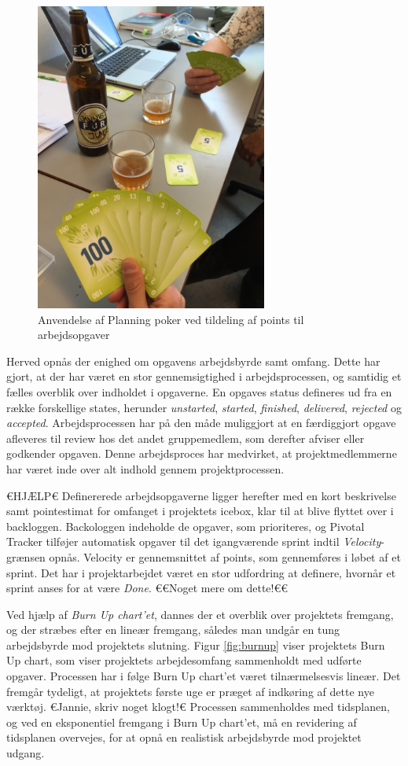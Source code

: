 	\begin{figure}[htb]
	\centering
	\includegraphics[width=3in]{Planningpoker}
	\caption{Anvendelse af Planning poker ved tildeling af points til arbejdsopgaver}
	\label{fig:planningpoker}	
	\end{figure}
	
	Herved opnås der enighed om opgavens arbejdsbyrde samt omfang. Dette har gjort, at der har været en stor gennemsigtighed i arbejdsprocessen, og samtidig et fælles overblik over indholdet i opgaverne. En opgaves status defineres ud fra en række forskellige states, herunder \textit{unstarted}, \textit{started}, \textit{finished}, \textit{delivered}, \textit{rejected} og \textit{accepted}. Arbejdsprocessen har på den måde muliggjort at en færdiggjort opgave afleveres til review hos det andet gruppemedlem, som derefter afviser eller godkender opgaven. Denne arbejdsproces har medvirket, at projektmedlemmerne har været inde over alt indhold gennem projektprocessen.  
    
    €HJÆLP€ 
	Definererede arbejdsopgaverne ligger herefter med en kort beskrivelse samt pointestimat for omfanget i projektets icebox, klar til at blive flyttet over i backloggen. Backologgen indeholde de opgaver, som prioriteres, og Pivotal Tracker tilføjer automatisk opgaver til det igangværende sprint indtil \textit{Velocity}-grænsen opnås. Velocity er gennemsnittet af points, som gennemføres i løbet af et sprint. Det har i projektarbejdet været en stor udfordring at definere, hvornår et sprint anses for at være \textit{Done}. €€Noget mere om dette!€€    
	
	Ved hjælp af \textit{Burn Up chart'et}, dannes der et overblik over projektets fremgang, og der stræbes efter en lineær fremgang, således man undgår en tung arbejdsbyrde mod projektets slutning. Figur \ref{fig:burnup} viser projektets Burn Up chart, som viser projektets arbejdesomfang sammenholdt med udførte opgaver. Processen har i følge Burn Up chart'et været tilnærmelsesvis lineær. Det fremgår tydeligt, at projektets første uge er præget af indkøring af dette nye værktøj. €Jannie, skriv noget klogt!€
	Processen sammenholdes med tidsplanen, og ved en eksponentiel fremgang i Burn Up chart'et, må en revidering af tidsplanen overvejes, for at opnå en realistisk arbejdsbyrde mod projektet udgang.  
		
